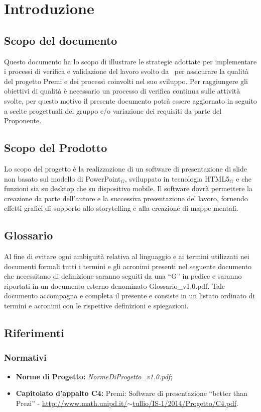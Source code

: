 \section{Introduzione}

\subsection{Scopo del documento}
Questo documento ha lo scopo di illustrare le strategie adottate per implementare i processi di verifica e validazione del lavoro svolto da \gruppo\ per assicurare la qualità del progetto Premi e dei processi coinvolti nel suo sviluppo. Per raggiungere gli obiettivi di qualità è necessario un processo di verifica continua sulle attività svolte, per questo motivo il presente documento potrà essere aggiornato in seguito a scelte progettuali del gruppo e/o variazione dei requisiti da parte del Proponente.

\subsection{Scopo del Prodotto}
Lo scopo del progetto è la realizzazione di un software di presentazione di slide non basato sul modello di PowerPoint$_{G}$, sviluppato in tecnologia HTML5$_{G}$ e che funzioni sia su desktop che su dispositivo mobile. Il software dovrà permettere la creazione da parte dell'autore e la successiva presentazione del lavoro, fornendo effetti grafici di supporto allo storytelling e alla creazione di mappe mentali.

\subsection{Glossario}
Al fine di evitare ogni ambiguità relativa al linguaggio e ai termini utilizzati nei documenti formali tutti i termini e gli acronimi presenti nel seguente documento che necessitano di definizione saranno seguiti da una ``G'' in pedice e saranno riportati in un documento esterno denominato Glossario\_v1.0.pdf. Tale documento accompagna e completa il presente e consiste in un listato ordinato di termini e acronimi con le rispettive definizioni e spiegazioni.

\subsection{Riferimenti}
\subsubsection{Normativi}
\begin{itemize}
	\item \textbf{Norme di Progetto:} \textit{NormeDiProgetto\_v1.0.pdf};
	\item \textbf{Capitolato d'appalto C4:} Premi: Software di presentazione ``better than Prezi'' - \href{http://www.math.unipd.it/~tullio/IS-1/2014/Progetto/C4.pdf}{http://www.math.unipd.it/$\sim$tullio/IS-1/2014/Progetto/C4.pdf}.
\end{itemize}
